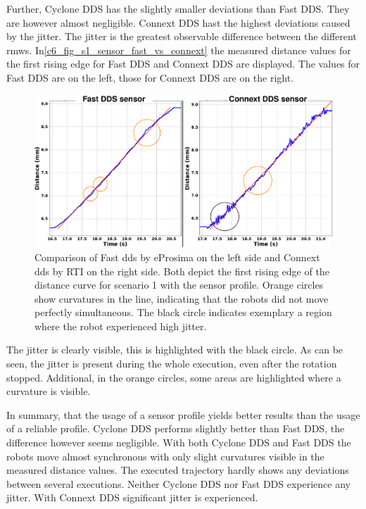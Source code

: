 Further, Cyclone DDS has the slightly smaller deviations than Fast DDS. They are however almost negligible. Connext DDS hast the highest deviations caused by the jitter. The jitter is the greatest observable difference between the different \glspl{rmw}. In\autoref{c6_fig_s1_sensor_fast_vs_connext} the measured distance values for the first rising edge for Fast DDS and Connext DDS are displayed. The values for Fast DDS are on the left, those for Connext DDS are on the right.
\begin{figure}[htbp]
	\centering
	\includegraphics[width=1\textwidth]{Figures/c6/s1/s1_sensor_fast_vs_connext.png}
	\caption{Comparison of Fast \gls{dds} by eProsima on the left side and Connext \gls{dds} by RTI on the right side. Both depict the first rising edge of the distance curve for scenario 1 with the sensor profile. Orange circles show curvatures in the line, indicating that the robots did not move perfectly simultaneous. The black circle indicates exemplary a region where the robot experienced high jitter. }
	\label{c6_fig_s1_sensor_fast_vs_connext}
\end{figure}
The jitter is clearly visible, this is highlighted with the black circle. As can be seen, the jitter is present during the whole execution, even after the rotation stopped. Additional, in the orange circles, some areas are highlighted where a curvature is visible.

In summary, that the usage of a sensor profile yields better results than the usage of a reliable profile. Cyclone DDS performs slightly better than Fast DDS, the difference however seems negligible. With both Cyclone DDS and Fast DDS the robots move almost synchronous with only slight curvatures visible in the measured distance values. The executed trajectory hardly shows any deviations between several executions. Neither Cyclone DDS nor Fast DDS experience any jitter. With Connext DDS significant jitter is experienced.


